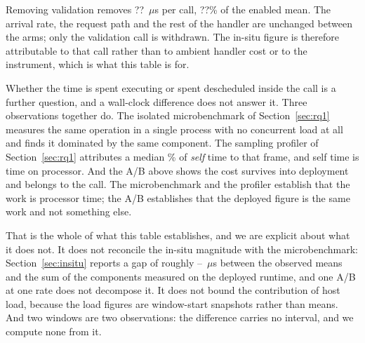 \documentclass[pdflatex,sn-basic,twocolumn]{sn-jnl}%
\providecommand{\ABDelta}{??}          %
\providecommand{\ABDeltaPct}{??}       %
\begin{document}
Removing validation removes \ABDelta~$\mu$s per call, \ABDeltaPct\% of the
enabled mean. The arrival rate, the request path and the rest of the handler are
unchanged between the arms; only the validation call is withdrawn. The in-situ
figure is therefore attributable to that call rather than to ambient handler
cost or to the instrument, which is what this table is for.

Whether the time is spent executing or spent descheduled inside the call is a
further question, and a wall-clock difference does not answer it. Three
observations together do. The isolated microbenchmark of Section~\ref{sec:rq1}
measures the same operation in a single process with no concurrent load at all
and finds it dominated by the same component. The sampling profiler of
Section~\ref{sec:rq1} attributes a median \ProfHostPct\% of \emph{self} time to
that frame, and self time is time on processor. And the A/B above shows the cost
survives into deployment and belongs to the call. The microbenchmark and the
profiler establish that the work is processor time; the A/B establishes that the
deployed figure is the same work and not something else.


That is the whole of what this table establishes, and we are explicit about what
it does not. It does not reconcile the in-situ magnitude with the microbenchmark:
Section~\ref{sec:insitu} reports a gap of roughly
\InsituUnaccountedLo--\InsituUnaccountedHi~$\mu$s between the observed means and
the sum of the components measured on the deployed runtime, and one A/B at one
rate does not decompose it. It does not bound the contribution of host load,
because the load figures are window-start snapshots rather than means. And two
windows are two observations: the difference carries no interval, and we compute
none from it.
\end{document}
